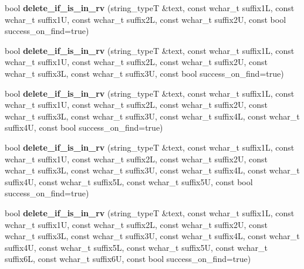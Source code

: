 \begin{DoxyCompactItemize}
\item 
\hypertarget{classstemming_1_1stem_a5d0a95806d9264f7238bf425311d1dfc}{bool {\bfseries delete\+\_\+if\+\_\+is\+\_\+in\+\_\+rv} (string\+\_\+type\+T \&text, const wchar\+\_\+t suffix1\+L, const wchar\+\_\+t suffix1\+U, const wchar\+\_\+t suffix2\+L, const wchar\+\_\+t suffix2\+U, const bool success\+\_\+on\+\_\+find=true)}\label{classstemming_1_1stem_a5d0a95806d9264f7238bf425311d1dfc}

\item 
\hypertarget{classstemming_1_1stem_a70623a86bd9b759befe998a364d2bad2}{bool {\bfseries delete\+\_\+if\+\_\+is\+\_\+in\+\_\+rv} (string\+\_\+type\+T \&text, const wchar\+\_\+t suffix1\+L, const wchar\+\_\+t suffix1\+U, const wchar\+\_\+t suffix2\+L, const wchar\+\_\+t suffix2\+U, const wchar\+\_\+t suffix3\+L, const wchar\+\_\+t suffix3\+U, const bool success\+\_\+on\+\_\+find=true)}\label{classstemming_1_1stem_a70623a86bd9b759befe998a364d2bad2}

\item 
\hypertarget{classstemming_1_1stem_aa14e355385422f170a184e1e2182c6b0}{bool {\bfseries delete\+\_\+if\+\_\+is\+\_\+in\+\_\+rv} (string\+\_\+type\+T \&text, const wchar\+\_\+t suffix1\+L, const wchar\+\_\+t suffix1\+U, const wchar\+\_\+t suffix2\+L, const wchar\+\_\+t suffix2\+U, const wchar\+\_\+t suffix3\+L, const wchar\+\_\+t suffix3\+U, const wchar\+\_\+t suffix4\+L, const wchar\+\_\+t suffix4\+U, const bool success\+\_\+on\+\_\+find=true)}\label{classstemming_1_1stem_aa14e355385422f170a184e1e2182c6b0}

\item 
\hypertarget{classstemming_1_1stem_adb10d6f58dca24420ce2b1fd7e58928f}{bool {\bfseries delete\+\_\+if\+\_\+is\+\_\+in\+\_\+rv} (string\+\_\+type\+T \&text, const wchar\+\_\+t suffix1\+L, const wchar\+\_\+t suffix1\+U, const wchar\+\_\+t suffix2\+L, const wchar\+\_\+t suffix2\+U, const wchar\+\_\+t suffix3\+L, const wchar\+\_\+t suffix3\+U, const wchar\+\_\+t suffix4\+L, const wchar\+\_\+t suffix4\+U, const wchar\+\_\+t suffix5\+L, const wchar\+\_\+t suffix5\+U, const bool success\+\_\+on\+\_\+find=true)}\label{classstemming_1_1stem_adb10d6f58dca24420ce2b1fd7e58928f}

\item 
\hypertarget{classstemming_1_1stem_a2102feb734da90e80172d1f34102c8cd}{bool {\bfseries delete\+\_\+if\+\_\+is\+\_\+in\+\_\+rv} (string\+\_\+type\+T \&text, const wchar\+\_\+t suffix1\+L, const wchar\+\_\+t suffix1\+U, const wchar\+\_\+t suffix2\+L, const wchar\+\_\+t suffix2\+U, const wchar\+\_\+t suffix3\+L, const wchar\+\_\+t suffix3\+U, const wchar\+\_\+t suffix4\+L, const wchar\+\_\+t suffix4\+U, const wchar\+\_\+t suffix5\+L, const wchar\+\_\+t suffix5\+U, const wchar\+\_\+t suffix6\+L, const wchar\+\_\+t suffix6\+U, const bool success\+\_\+on\+\_\+find=true)}\label{classstemming_1_1stem_a2102feb734da90e80172d1f34102c8cd}


\end{DoxyCompactItemize}
